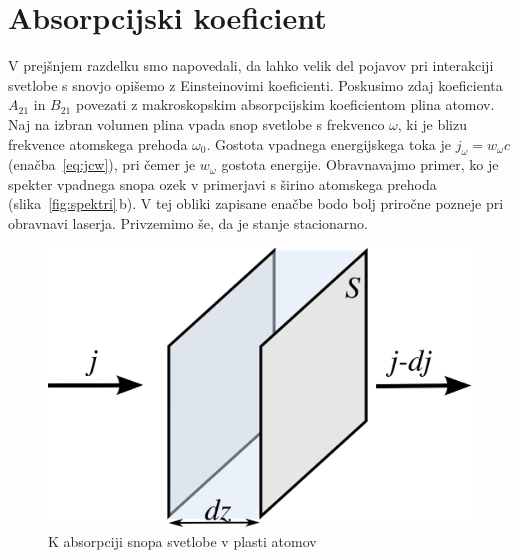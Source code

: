 \section{Absorpcijski koeficient}

V prejšnjem razdelku smo napovedali, da lahko velik del pojavov pri interakciji 
svetlobe s snovjo opišemo z Einsteinovimi koeficienti. Poskusimo zdaj 
koeficienta $A_{21}$ in $B_{21}$ povezati z makroskopskim absorpcijskim
koeficientom plina atomov. \\

\noindent
Naj na izbran volumen plina vpada snop svetlobe s frekvenco
$\omega$, ki je blizu frekvence atomskega prehoda $\omega_{0}$. Gostota
vpadnega energijskega toka je $j_{\omega}=w_{\omega}c$ (enačba~\ref{eq:jcw}), 
pri čemer je $w_{\omega}$ gostota energije. Obravnavajmo primer, ko je 
spekter vpadnega snopa ozek v primerjavi s širino atomskega prehoda
(slika~\ref{fig:spektri}\,b). V tej obliki zapisane enačbe bodo bolj 
priročne pozneje pri obravnavi laserja. Privzemimo še, da
je stanje stacionarno. 
\begin{figure}[h]
\centering
\includegraphics[width=6truecm]{slike/05_Absorpcija.png}
\caption{K absorpciji snopa svetlobe v plasti atomov}
\label{fig:abs}
\end{figure}

